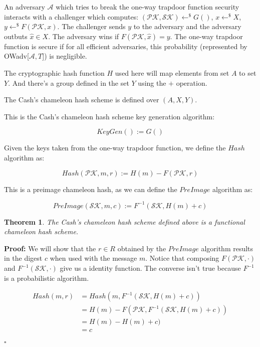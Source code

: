 \documentclass[a4paper]{article}
\newtheorem{theorem}{Theorem}
\newcommand*{\qed}{\hfill\ensuremath{\square}}
\begin{document}
 An adversary $\mathcal{A}$ which tries to break the one-way trapdoor function security interacts with a challenger which computes: $(\mathcal{PK}, \mathcal{SK}) \leftarrow^{\$}G()$, $x \leftarrow^{\$}X$, $y \leftarrow^{\$}F(\mathcal{PK}, x)$. The challenger sends $y$ to the adversary and the adversary outbuts $\hat x \in X$. The adversary wins if $F(\mathcal{PK}, \hat x) = y$. The one-way trapdoor function is secure if for all efficient adversaries, this probability (represented by OWadv[$\mathcal{A}, T$]) is negligible.
 
 The cryptographic hash function $H$ used here will map elements from set $A$ to set $Y$. And there's a group defined in the set $Y$ using the $+$ operation.
 
 The Cash's chameleon hash scheme is defined over $(A, X, Y)$.
 
This is the Cash's chameleon hash scheme key generation algorithm:

$$
KeyGen() := G()
$$
 
Given the keys taken from the one-way trapdoor function, we define the $Hash$ algorithm as:

$$
Hash(\mathcal{PK}, m, r) := H(m) - F(\mathcal{PK}, r)
$$

This is a preimage chameleon hash, as we can define the $PreImage$ algorithm as:

$$
PreImage(\mathcal{SK}, m, c) := F^{-1}(\mathcal{SK}, H(m) + c)
$$

\begin{theorem}
The Cash's chameleon hash scheme defined above is a functional chameleon hash scheme.
\end{theorem}

\textbf{Proof:} We will show that the $r \in R$ obtained by the $PreImage$ algorithm results in the digest $c$ when used with the message $m$. Notice that composing $F(\mathcal{PK}, \cdot)$ and $F^{-1}(\mathcal{SK}, \cdot)$ give us a identity function. The converse isn't true because $F^{-1}$ is a probabilistic algorithm.

\begin{equation}
 \begin{split}
 Hash(m, r) &= Hash(m, F^{-1}(\mathcal{SK}, H(m) + c))\\
 &= H(m) - F(\mathcal{PK}, F^{-1}(\mathcal{SK}, H(m) + c))\\
&= H(m) - H(m) + c)\\
&= c\\
 \end{split}
 \end{equation} \qed
\end{document}
